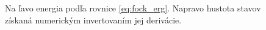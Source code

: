 \documentclass[
	11pt, %
]{beamer}
\begin{document}
\begin{frame}
\begin{figure}
    \vspace{-10mm}
    \small
    \caption{Na ľavo energia podľa rovnice \eqref{eq:fock_erg}.  Napravo hustota stavov získaná numerickým invertovaním jej derivácie.}%
    \normalsize
    \label{fig:example}%
\end{figure}
\end{frame}
\end{document}
